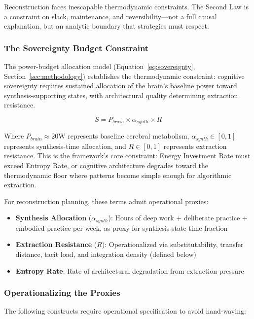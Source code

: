 Reconstruction faces inescapable thermodynamic constraints. The Second Law is a constraint on slack, maintenance, and reversibility---not a full causal explanation, but an analytic boundary that strategies must respect.

\subsubsection{The Sovereignty Budget Constraint}

The power-budget allocation model (Equation~\ref{eq:sovereignty}, Section~\ref{sec:methodology}) establishes the thermodynamic constraint: cognitive sovereignty requires sustained allocation of the brain's baseline power toward synthesis-supporting states, with architectural quality determining extraction resistance.

\begin{equation}
S = P_{brain} \times \alpha_{synth} \times R
\end{equation}

\noindent Where $P_{brain} \approx 20$W represents baseline cerebral metabolism, $\alpha_{synth} \in [0,1]$ represents synthesis-time allocation, and $R \in [0,1]$ represents extraction resistance. This is the framework's core constraint: Energy Investment Rate must exceed Entropy Rate, or cognitive architecture degrades toward the thermodynamic floor where patterns become simple enough for algorithmic extraction.

For reconstruction planning, these terms admit operational proxies:

\begin{itemize}
\item \textbf{Synthesis Allocation} ($\alpha_{synth}$): Hours of deep work + deliberate practice + embodied practice per week, as proxy for synthesis-state time fraction
\item \textbf{Extraction Resistance} ($R$): Operationalized via substitutability, transfer distance, tacit load, and integration density (defined below)
\item \textbf{Entropy Rate}: Rate of architectural degradation from extraction pressure
\end{itemize}

\subsubsection{Operationalizing the Proxies}

The following constructs require operational specification to avoid hand-waving:

